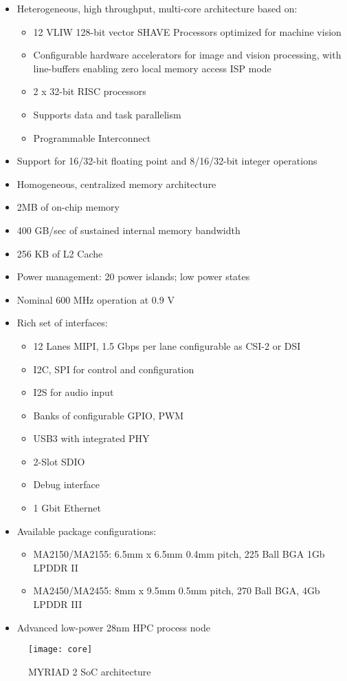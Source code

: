 \begin{itemize}
	\item Heterogeneous, high throughput, multi-core architecture based on:
	\begin{itemize}
		\item 12 VLIW 128-bit vector SHAVE Processors optimized for machine vision
		\item Configurable hardware accelerators for image and vision processing, with line-buffers enabling zero local memory access ISP mode
		\item 2 x 32-bit RISC processors 
		\item Supports data and task parallelism 
		\item Programmable Interconnect
		\end{itemize}
		\item Support for 16/32-bit floating point and 8/16/32-bit integer operations
		\item Homogeneous, centralized memory architecture
		\item 2MB of on-chip memory
		\item 400 GB/sec of sustained internal memory bandwidth
		\item 256 KB of L2 Cache
		\item Power management: 20 power islands; low power states
		\item Nominal 600 MHz operation at 0.9 V
		\item Rich set of interfaces:
		\begin{itemize}
			\item 12 Lanes MIPI, 1.5 Gbps per lane configurable as CSI-2 or DSI
			\item I2C, SPI for control and configuration
			\item I2S for audio input
			\item Banks of configurable GPIO, PWM
			\item USB3 with integrated PHY
			\item 2-Slot SDIO
			\item Debug interface
			\item 1 Gbit Ethernet
		\end{itemize}
		\item Available package configurations:
		\begin{itemize}
			\item MA2150/MA2155: 6.5mm x 6.5mm 0.4mm pitch, 225 Ball BGA 1Gb LPDDR II
			\item MA2450/MA2455: 8mm x 9.5mm 0.5mm pitch, 270 Ball BGA, 4Gb LPDDR III
		\end{itemize}
		\item Advanced low-power 28nm HPC process node
\end{itemize}
%
\begin{figure}[htb]
\centering
\texttt{[image: core]}
\caption{MYRIAD 2 SoC architecture}
\label{fig:architecture}
\end{figure}
%
